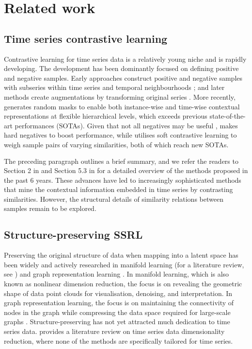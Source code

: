 \section{Related work}
\label{sec: related work}
\subsection{Time series contrastive learning}
Contrastive learning for time series data is a relatively young niche and is rapidly developing. The development has been dominantly focused on defining positive and negative samples. Early approaches construct positive and negative samples with subseries within time series \cite{franceschi2019tloss} and temporal neighbourhoods \cite{tonekaboni2021unsupervised}; and later methods create augmentations by transforming original series \cite{eldele2021tstcc,eldele2023}. More recently, \cite{Yue2022ts2vec} generates random masks to enable both instance-wise and time-wise contextual representations at flexible hierarchical levels, which exceeds previous state-of-the-art performances (SOTAs). Given that not all negatives may be useful \cite{cai2020negative,Jeon2021}, \cite{liu2024timesurl} makes hard negatives to boost performance, while \cite{lee2024softclt} utilises soft contrastive learning to weigh sample pairs of varying similarities, both of which reach new SOTAs. 

The preceding paragraph outlines a brief summary, and we refer the readers to Section 2 in \cite{lee2024softclt} and Section 5.3 in \cite{trirat2024universal} for a detailed overview of the methods proposed in the past 6 years. These advances have led to increasingly sophisticated methods that mine the contextual information embedded in time series by contrasting similarities. However, the structural details of similarity relations between samples remain to be explored. 

\subsection{Structure-preserving SSRL}
Preserving the original structure of data when mapping into a latent space has been widely and actively researched in manifold learning (for a literature review, see \cite{meila2024}) and graph representation learning \cite{ju2024,khoshraftar2024}. In manifold learning, which is also known as nonlinear dimension reduction, the focus is on revealing the geometric shape of data point clouds for visualisation, denoising, and interpretation. In graph representation learning, the focus is on maintaining the connectivity of nodes in the graph while compressing the data space required for large-scale graphs \cite{Yao2024}. Structure-preserving has not yet attracted much dedication to time series data. \cite{ashraf2023} provides a literature review on time series data dimensionality reduction, where none of the methods are specifically tailored for time series.

